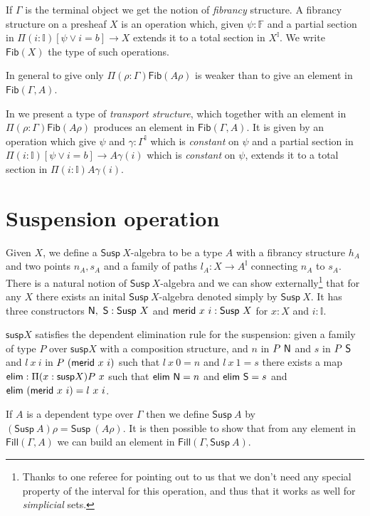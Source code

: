 \documentclass[10pt,a4paper]{article}
\newcommand{\north}{{\sf N}}
\newcommand{\south}{{\sf S}}
\newcommand{\merid}{{\sf merid}}
\newcommand{\elim}{{\sf elim}}
\newcommand{\II}{\mathbb{I}}
\newcommand{\FF}{\mathbb{F}}
\newcommand{\Fib}{\mathsf{Fib}}
\newcommand{\Susp}{\mathsf{Susp}}
\newcommand{\susp}{\mathsf{susp}}
\newcommand{\Fill}{\mathsf{Fill}}
\begin{document}
\medskip

 If $\Gamma$ is the terminal object we get the notion of {\em fibrancy} structure.
A fibrancy structure on a presheaf $X$ is an operation which, given
$\psi:\FF$ and a partial section in $\Pi (i:\II)[\psi\vee i = b]\rightarrow X$
extends it to a total section in $X^{\II}$.
We write $\Fib(X)$ the type of such operations.

 In general to give only $\Pi(\rho:\Gamma)\Fib(A\rho)$ is weaker than 
to give an element in $\Fib(\Gamma,A)$.

 In \cite{CHM} we present a type of {\em transport structure}, which 
together with an element in  $\Pi(\rho:\Gamma)\Fib(A\rho)$ produces
an element in  $\Fib(\Gamma,A)$.
It is given by an operation which give $\psi$ and $\gamma:\Gamma^{\II}$
which is {\em constant} on $\psi$ and a partial section in
$\Pi (i:\II)[\psi\vee i = b]\rightarrow A\gamma(i)$ which is {\em constant}
on $\psi$, extends it to a total section in $\Pi (i:\II)A\gamma(i)$.

\section{Suspension operation}

 Given $X$, we define a $\Susp~X$-algebra to be a type $A$ with a fibrancy
structure $h_A$ and two points $n_A,s_A$ and a family of paths $l_A:X\rightarrow A^{\II}$
connecting $n_A$ to $s_A$. There is a natural notion of $\Susp~X$-algebra and
we can show \cite{CHM} externally\footnote{Thanks to one referee for pointing out to us
that we don't need any special property of the interval for this operation, and thus that it
works as well for {\em simplicial} sets.} that for any $X$ there exists an inital $\Susp~X$-algebra
denoted simply by $\Susp~X$. It has three constructors $\north,~\south:\Susp~X$
and $\merid~x~i:\Susp~X$ for $x:X$ and $i:\II$.

\begin{theorem}
  $\susp{X}$ satisfies the dependent elimination rule for the
  suspension: given a family of type $P$ over $\susp{X}$ with a
  composition structure, and $n$ in $P~\north$ and $s$ in $P~\south$
  and $l~x~i$ in $P~(\merid~x~i)$ such that $l~x~0 = n$ and $l~x~1 =            
  s$ there exists a map $\elim:\Pi (x:\susp{X})P~x$ such that
  $\elim~\north = n$ and $\elim~\south = s$ and $\elim~(\merid~x~i) =           
  l~x~i$.
\end{theorem}

 If $A$ is a dependent type over $\Gamma$ then we define $\Susp~A$ by
$(\Susp~A)\rho = \Susp~(A\rho)$. It is then possible to show
\cite{CHM} that from any element in $\Fill(\Gamma,A)$ we can build
an element in $\Fill(\Gamma,\Susp~A)$.
\end{document}
